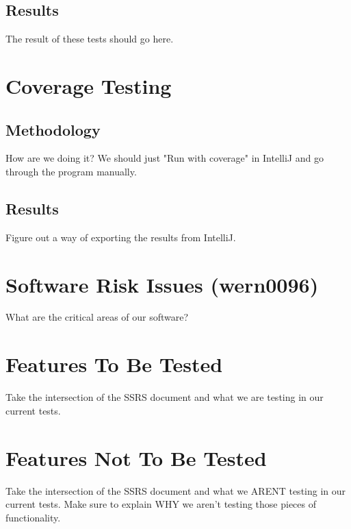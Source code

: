 \documentclass[14pt, a4paper]{article}
\begin{document}
\newpage

\subsection{Results}

The result of these tests should go here.

\newpage

\section{Coverage Testing}

\subsection{Methodology}

How are we doing it? We should just "Run with coverage" in IntelliJ and go through the program manually.

\newpage

\subsection{Results}

Figure out a way of exporting the results from IntelliJ.

\newpage
\section{Software Risk Issues (wern0096)}

What are the critical areas of our software?


\newpage
\section{Features To Be Tested}

Take the intersection of the SSRS document and what we are testing in our current tests.

\newpage
\section{Features Not To Be Tested}


Take the intersection of the SSRS document and what we ARENT testing in our current tests. Make sure to explain WHY we aren't testing those pieces of functionality.
\end{document}
